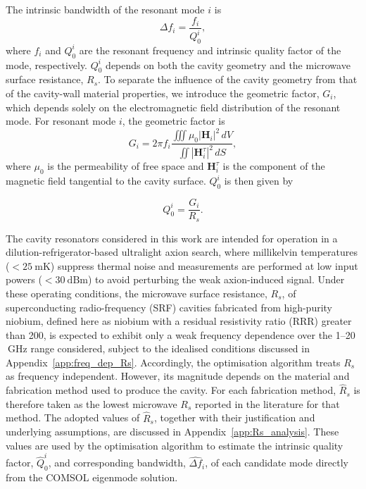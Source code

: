 \documentclass[
  aps,
  physrev,
  reprint,
  superscriptaddress,
  nofootinbib,
  amsmath,
  amssymb
]{revtex4-2}
\begin{document}
The intrinsic bandwidth of the resonant mode $i$ is 
\begin{equation}
    \Delta f_i=\frac{f_i}{Q_0^i},
\end{equation}
where $f_i$ and $Q_0^i$ are the resonant frequency and intrinsic quality factor of the mode, respectively. $Q_0^i$ depends on both the cavity geometry and the microwave surface resistance, $R_s$. To separate the influence of the cavity geometry from that of the cavity-wall material properties, we introduce the geometric factor, $G_i$, which depends solely on the electromagnetic field distribution of the resonant mode. For resonant mode $i$, the geometric factor is~\cite{Creedon16}
\begin{equation}
    G_i=
    2\pi f_i
    \frac{\displaystyle \iiint \mu_0\left|\mathbf{H}_i\right|^2\,dV}
         {\displaystyle \iint \left|\mathbf{H}_i^{\tau}\right|^2\,dS},
    \label{eq:geom_factor}
\end{equation}
where $\mu_0$ is the permeability of free space and $\mathbf{H}_i^{\tau}$ is the component of the magnetic field tangential to the cavity surface. $Q_0^i$ is then given by

\begin{equation}
    Q_0^i=\frac{G_i}{R_s}.
    \label{eq:Q_factor}
\end{equation}

The cavity resonators considered in this work are intended for operation in a dilution-refrigerator-based ultralight axion search, where millikelvin temperatures ($<25~\mathrm{mK}$) suppress thermal noise and measurements are performed at low input powers ($<30~\mathrm{dBm}$) to avoid perturbing the weak axion-induced signal. Under these operating conditions, the microwave surface resistance, $R_s$, of superconducting radio-frequency (SRF) cavities fabricated from high-purity niobium, defined here as niobium with a residual resistivity ratio (RRR) greater than 200, is expected to exhibit only a weak frequency dependence over the 1–20$~\mathrm{GHz}$ range considered, subject to the idealised conditions discussed in Appendix~\ref{app:freq_dep_Rs}. Accordingly, the optimisation algorithm treats $R_s$ as frequency independent. However, its magnitude depends on the material and fabrication method used to produce the cavity. For each fabrication method, $\hat{R}_s$ is therefore taken as the lowest microwave $R_s$ reported in the literature for that method. The adopted values of $\hat{R}_s$, together with their justification and underlying assumptions, are discussed in Appendix~\ref{app:Rs_analysis}. These values are used by the optimisation algorithm to estimate the intrinsic quality factor, $\hat{Q}_0^i$, and corresponding bandwidth, $\hat{\Delta f}_i$, of each candidate mode directly from the COMSOL eigenmode solution.
\end{document}
